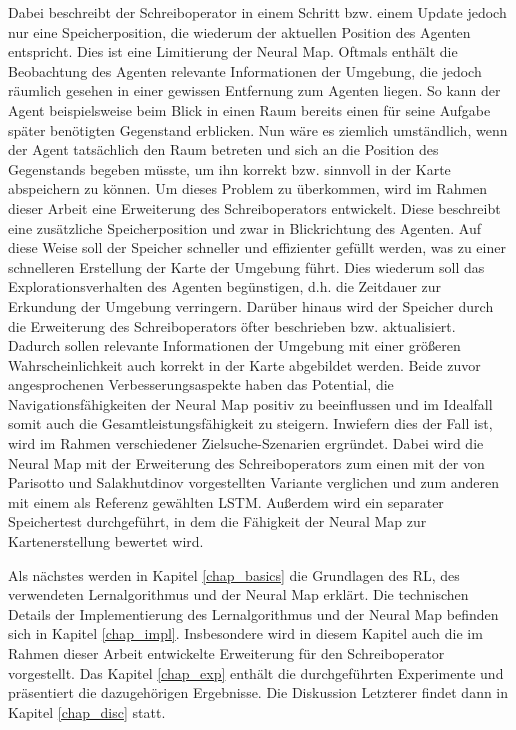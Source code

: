 Dabei beschreibt der Schreiboperator in einem Schritt bzw. einem Update jedoch nur eine Speicherposition, die wiederum der aktuellen Position des Agenten entspricht. Dies ist eine Limitierung der Neural Map. Oftmals enthält die Beobachtung des Agenten relevante Informationen der Umgebung, die jedoch räumlich gesehen in einer gewissen Entfernung zum Agenten liegen. So kann der Agent beispielsweise beim Blick in einen Raum bereits einen für seine Aufgabe später benötigten Gegenstand erblicken. Nun wäre es ziemlich umständlich, wenn der Agent tatsächlich den Raum betreten und sich an die Position des Gegenstands begeben müsste, um ihn korrekt bzw. sinnvoll in der Karte abspeichern zu können. Um dieses Problem zu überkommen, wird im Rahmen dieser Arbeit eine Erweiterung des Schreiboperators entwickelt. Diese beschreibt eine zusätzliche Speicherposition und zwar in Blickrichtung des Agenten. Auf diese Weise soll der Speicher schneller und effizienter gefüllt werden, was zu einer schnelleren Erstellung der Karte der Umgebung führt. Dies wiederum soll das Explorationsverhalten des Agenten begünstigen, d.h. die Zeitdauer zur Erkundung der Umgebung verringern. Darüber hinaus wird der Speicher durch die Erweiterung des Schreiboperators öfter beschrieben bzw. aktualisiert. Dadurch sollen relevante Informationen der Umgebung mit einer größeren Wahrscheinlichkeit auch korrekt in der Karte abgebildet werden. Beide zuvor angesprochenen Verbesserungsaspekte haben das Potential, die Navigationsfähigkeiten der Neural Map positiv zu beeinflussen und im Idealfall somit auch die Gesamtleistungsfähigkeit zu steigern. Inwiefern dies der Fall ist, wird im Rahmen verschiedener Zielsuche-Szenarien ergründet. Dabei wird die Neural Map mit der Erweiterung des Schreiboperators zum einen mit der von Parisotto und Salakhutdinov vorgestellten Variante verglichen und zum anderen mit einem als Referenz gewählten LSTM. Außerdem wird ein separater Speichertest durchgeführt, in dem die Fähigkeit der Neural Map zur Kartenerstellung bewertet wird.

Als nächstes werden in Kapitel \ref{chap_basics} die Grundlagen des RL, des verwendeten Lernalgorithmus und der Neural Map erklärt. Die technischen Details der Implementierung des Lernalgorithmus und der Neural Map befinden sich in Kapitel \ref{chap_impl}. Insbesondere wird in diesem Kapitel auch die im Rahmen dieser Arbeit entwickelte Erweiterung für den Schreiboperator vorgestellt. Das Kapitel \ref{chap_exp} enthält die durchgeführten Experimente und präsentiert die dazugehörigen Ergebnisse. Die Diskussion Letzterer findet dann in Kapitel \ref{chap_disc} statt.

















